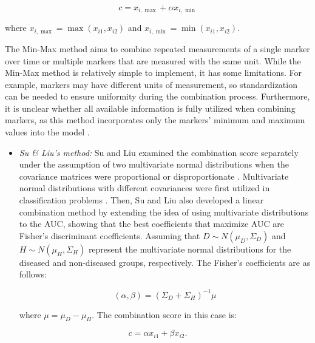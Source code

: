 \begin{equation}
c = x_{i,\max} + \alpha x_{i,\min}
  \label{eq:maxMinComb}
\end{equation}

where \(x_{i,\max} = \max(x_{i1}, x_{i2})\) and \(x_{i,\min} = \min(x_{i1}, x_{i2})\).

The Min-Max method aims to combine repeated measurements of a single marker over time or multiple markers that are measured with the same unit. While the Min-Max method is relatively simple to implement, it has some limitations. For example, markers may have different units of measurement, so standardization can be needed to ensure uniformity during the combination process. Furthermore, it is unclear whether all available information is fully utilized when combining markers, as this method incorporates only the markers' minimum and maximum values into the model \citep{kang2016linear}.

\begin{itemize}
\item
  \emph{Su \& Liu's method:}
  Su and Liu examined the combination score separately under the assumption of two multivariate normal distributions when the covariance matrices were proportional or disproportionate \citep{su1993linear}. Multivariate normal distributions with different covariances were first utilized in classification problems \citep{anderson1962classification}. Then, Su and Liu also developed a linear combination method by extending the idea of using multivariate distributions to the AUC, showing that the best coefficients that maximize AUC are Fisher's discriminant coefficients. Assuming that \(D \sim N(\mu_D, \Sigma_D)\) and \(H \sim N(\mu_H, \Sigma_H)\) represent the multivariate normal distributions for the diseased and non-diseased groups, respectively. The Fisher's coefficients are as follows:

  \begin{equation}
  (\alpha, \beta) = (\Sigma_{D} + \Sigma_{H})^{-1} \mu
  \label{eq:paramEstimation}
  \end{equation}

  where \(\mu = \mu_D - \mu_H\). The combination score in this case is:
\end{itemize}

\begin{equation}
c = \alpha x_{i1} + \beta x_{i2}.
  \label{eq:linearParamComb}
\end{equation}

